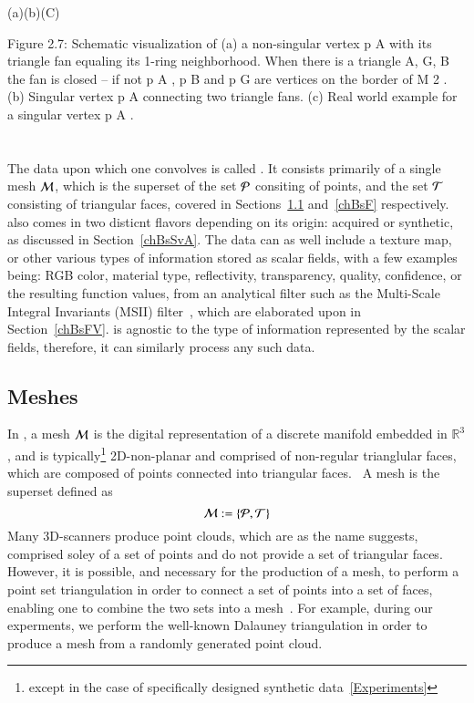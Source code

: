 (a)(b)(C)

Figure 2.7: Schematic visualization of (a) a non-singular vertex p A with its triangle fan equaling its 1-ring neighborhood. When there is a triangle {A, G, B} the fan is closed – if not p A , p B and p G are vertices on the border of M 2 . (b) Singular vertex p A connecting two triangle fans. (c) Real world example for a singular vertex p A .~\cite[p.~29]{Mara12}
%
%
%
%
%
\section{\tdd}
The data upon which one convolves  is called \tdd{}. It consists primarily of a single mesh $\mathcal{M}$, which is the superset of the set $\mathcal{P}$ consiting of points, and the set $\mathcal{T}$ consisting of triangular faces, covered in Sections~\ref{chBsP} and~\ref{chBsF} respectively. \tdd{} also comes in two disticnt flavors depending on its origin: acquired or synthetic, as discussed in Section~\ref{chBsSvA}. The data can as well include a texture map, or other various types of information stored as scalar fields, with a few examples being: RGB color, material type, reflectivity, transparency, quality, confidence, or the resulting function values, from an analytical filter such as the Multi-Scale Integral Invariants (MSII) filter~\cite[p.~21]{Mara12}, which are elaborated upon in Section~\ref{chBsFV}.  is agnostic to the type of information represented by the scalar fields, therefore, it can similarly process any such data.
%
\subsection{Meshes}
\label{chBsP}
In \tdd{}, a mesh $\mathcal{M}$ is the digital representation of a discrete manifold embedded in $\mathbb{R}^3$, and is typically\footnote{except in the case of specifically designed synthetic data~\ref{Experiments}} 2D-non-planar and comprised of non-regular trianglular faces, which are composed of points connected into triangular faces.~\cite[p.~25]{Mara12} A mesh is the superset defined as
\begin{equation}
	\mathcal{M} := \left \{\mathcal{P}, \mathcal{T}\right \}
	\label{eq:defineMesh}
\end{equation}%
%
Many 3D-scanners produce point clouds\todoCitation{}, which are as the name suggests, comprised soley of a set of points and do not provide a set of triangular faces. However, it is possible, and necessary for the production of a mesh, to perform a point set triangulation\todoCitation{} in order to connect a set of points into a set of faces, enabling one to combine the two sets into a mesh~\cite[p.~26]{Mara12}. For example, during our experments, we perform the well-known Dalauney triangulation\todoCitation{} in order to produce a mesh from a randomly generated point cloud.
%
